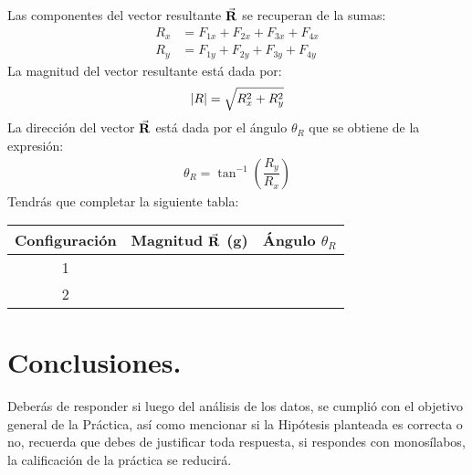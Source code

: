 \documentclass[14pt]{extarticle}
\begin{document}
Las componentes del vector resultante $\va{R}$ se recuperan de la sumas:
\begin{align*}
R_{x} &= F_{1x} + F_{2x} + F_{3x} + F_{4x} \\[0.5em]
R_{y} &= F_{1y} + F_{2y} + F_{3y} + F_{4y}
\end{align*}
La magnitud del vector resultante está dada por:
\begin{align*}
\abs{R} = \sqrt{R_{x}^{2} + R_{y}^{2}}
\end{align*}
La dirección del vector $\va{R}$ está dada por el ángulo $\theta_{R}$ que se obtiene de la expresión:
\begin{align*}
\theta_{R} = \tan^{-1} \left( \dfrac{R_{y}}{R_{x}} \right)
\end{align*}
Tendrás que completar la siguiente tabla:
\begin{table}
\centering
\begin{tabular}{|c | c | c |} \hline
Configuración & Magnitud $\va{R}$ (\unit{\gram}) & Ángulo $\theta_{R}$ \\ \hline
1 & & \\ \hline
2 & & \\ \hline
\end{tabular}
\end{table}

\section{Conclusiones.}

Deberás de responder si luego del análisis de los datos, se cumplió con el objetivo general de la Práctica, así como mencionar si la Hipótesis planteada es correcta o no, recuerda que debes de justificar toda respuesta, si respondes con monosílabos, la calificación de la práctica se reducirá.
\end{document}
